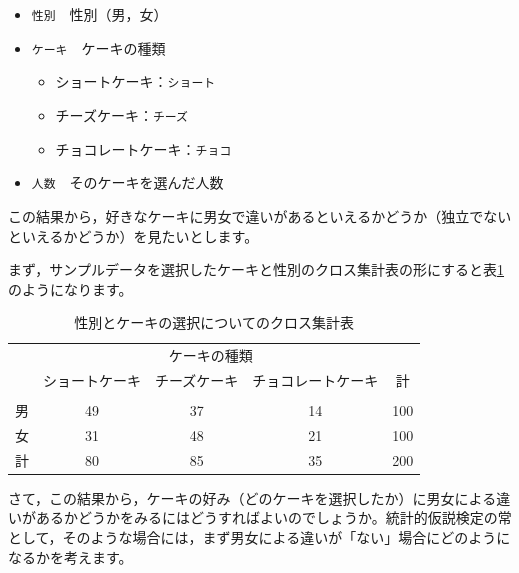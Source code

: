 \documentclass[
  12pt,
  a5jpaper,
  lualatex, ja=standard]{bxjsbook}
\providecommand{\tightlist}{%
  \setlength{\itemsep}{0pt}\setlength{\parskip}{0pt}}
\newenvironment{jmvvar}{%
	\begin{center}%
	\begin{tcolorbox}[%
		title=変数一覧,
		colframe=daidai,
		colbacktitle=daidai!30!white,
		coltitle=daidai!10!black,
		colback=daidai!2!white,
		breakable,
		width=.9\textwidth
		]\small\addtolength{\leftmargini}{-3\labelsep}%
	}%
	{\end{tcolorbox}\end{center}}
\begin{document}
\begin{jmvvar}

\begin{itemize}
\tightlist
\item
  \texttt{性別}　性別（男，女）
\item
  \texttt{ケーキ}　ケーキの種類

  \begin{itemize}
  \tightlist
  \item
    ショートケーキ：\texttt{ショート}
  \item
    チーズケーキ：\texttt{チーズ}
  \item
    チョコレートケーキ：\texttt{チョコ}
  \end{itemize}
\item
  \texttt{人数}　そのケーキを選んだ人数
\end{itemize}

\end{jmvvar}

この結果から，好きなケーキに男女で違いがあるといえるかどうか（独立でないといえるかどうか）を見たいとします。

まず，サンプルデータを選択したケーキと性別のクロス集計表の形にすると表\ref{tab:frequencies-cake-table1}のようになります。

\begin{table}[H]

\caption{\label{tab:frequencies-cake-table1}性別とケーキの選択についてのクロス集計表}
\centering
\begin{tabular}[t]{lcccc}
\toprule
\multicolumn{1}{c}{ } & \multicolumn{3}{c}{ケーキの種類} & \multicolumn{1}{c}{ } \\
\cmidrule(l{3pt}r{3pt}){2-4}
  & ショートケーキ & チーズケーキ & チョコレートケーキ & 計\\
\midrule
\addlinespace[0.3em]
\multicolumn{5}{l}{\textbf{性別}}\\
\hspace{1em}男 & 49 & 37 & 14 & 100\\
\hspace{1em}女 & 31 & 48 & 21 & 100\\
計 & 80 & 85 & 35 & 200\\
\bottomrule
\end{tabular}
\end{table}

さて，この結果から，ケーキの好み（どのケーキを選択したか）に男女による違いがあるかどうかをみるにはどうすればよいのでしょうか。統計的仮説検定の常として，そのような場合には，まず男女による違いが「ない」場合にどのようになるかを考えます。
\end{document}
